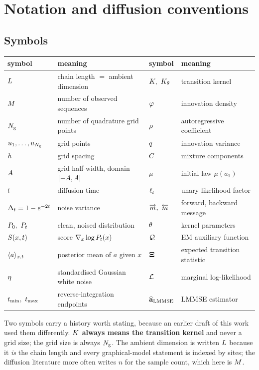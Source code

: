 \section{Notation and diffusion conventions}
\label{app:notation}

\subsection{Symbols}

\begin{center}
\small
\begin{tabular}{ll@{\qquad}ll}
\toprule
symbol & meaning & symbol & meaning \\
\midrule
$L$ & chain length $=$ ambient dimension & $\kernel,\ \kernelth$ & transition kernel \\
$M$ & number of observed sequences & $\varphi$ & innovation density \\
$N_{\mathrm{g}}$ & number of quadrature grid points & $\rho$ & autoregressive coefficient \\
$u_{1},\dots,u_{N_{\mathrm{g}}}$ & grid points & $q$ & innovation variance \\
$h$ & grid spacing & $C$ & mixture components \\
$A$ & grid half-width, domain $[-A,A]$ & $\mu$ & initial law $\mu(a_1)$ \\
$t$ & diffusion time & $\ell_t$ & unary likelihood factor \\
$\Delta_t = 1-e^{-2t}$ & noise variance & $\lmsg,\ \rmsg$ & forward, backward message \\
$\Pz,\ \Pt$ & clean, noised distribution & $\theta$ & kernel parameters \\
$S(x,t)$ & score $\nabla_x\log P_t(x)$ & $\mathcal{Q}$ & EM auxiliary function \\
$\langle a \rangle_{x,t}$ & posterior mean of $a$ given $x$ & $\mathbf{\Xi}$ & expected transition statistic \\
$\mathbf{\eta}$ & standardised Gaussian white noise & $\mathcal{L}$ & marginal log-likelihood \\
$\tmin,\ \tmax$ & reverse-integration endpoints & $\widehat{\mathbf{a}}_{\mathrm{LMMSE}}$ & LMMSE estimator \\
\bottomrule
\end{tabular}
\end{center}

Two symbols carry a history worth stating, because an earlier draft of this work used them
differently. \textbf{$K$ always means the transition kernel} and never a grid size; the
grid size is always $N_{\mathrm{g}}$. The ambient dimension is written $L$ because it \emph{is} the
chain length and every graphical-model statement is indexed by sites; the diffusion literature
more often writes $n$ for the sample count, which here is $M$.

